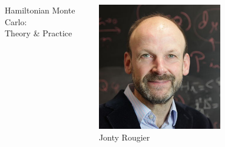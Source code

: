 \documentclass[aspectratio=169]{beamer}
\begin{document}
\begin{frame}
\begin{columns}
\begin{column}{0.45\textwidth}
{\LARGE Hamiltonian Monte Carlo:\\ Theory \& Practice}
\end{column}
\begin{column}{0.45\textwidth}
\centering
\includegraphics[width=0.6\textwidth]{jonty.jpg}\\
Jonty Rougier
\end{column}
\end{columns}
\end{frame}

\begin{frame}
\end{frame}
\end{document}
